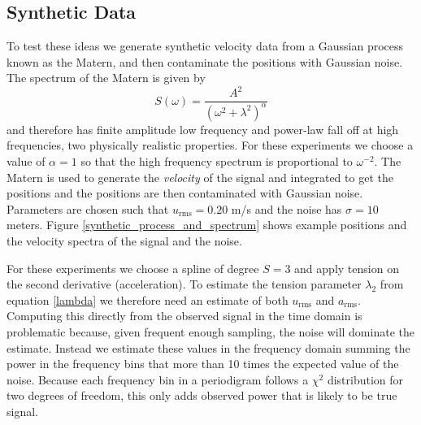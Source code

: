 \documentclass[10pt,journal]{IEEEtran}
\begin{document}
\subsection{Synthetic Data}
\label{sec:synthetic_data}

To test these ideas we generate synthetic velocity data from a Gaussian process known as the Matern, and then contaminate the positions with Gaussian noise. The spectrum of the Matern is given by
\begin{equation}
S(\omega) = \frac{A^2}{(\omega^2 + \lambda^2)^\alpha}
\end{equation}
and therefore has finite amplitude low frequency and power-law fall off at high frequencies, two physically realistic properties. For these experiments we choose a value of $\alpha=1$ so that the high frequency spectrum is proportional to $\omega^{-2}$. The Matern is used to generate the \emph{velocity} of the signal and integrated to get the positions and the positions are then contaminated with Gaussian noise. Parameters are chosen such that $u_{\textrm{rms}}=0.20$ m/s and the noise has $\sigma=10$ meters. Figure \ref{synthetic_process_and_spectrum} shows example positions and the velocity spectra of the signal and the noise.



For these experiments we choose a spline of degree $S=3$ and apply tension on the second derivative (acceleration). To estimate the tension parameter $\lambda_2$ from equation \ref{lambda} we therefore need an estimate of both $u_{\textrm{rms}}$ and $a_{\textrm{rms}}$. Computing this directly from the observed signal in the time domain is problematic because, given frequent enough sampling, the noise will dominate the estimate. Instead we estimate these values in the frequency domain summing the power in the frequency bins that more than 10 times the expected value of the noise. Because each frequency bin in a periodigram follows a $\chi^2$ distribution for two degrees of freedom, this only adds observed power that is likely to be true signal.
\end{document}
